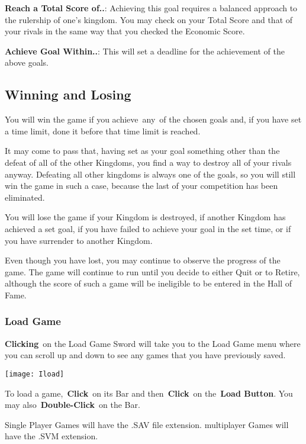 \textbf{Reach a Total Score of..}: Achieving this goal requires a balanced approach to the rulership of one’s kingdom. You may check on your Total Score and that of your rivals in the same way that you checked the Economic Score.

\textbf{Achieve Goal Within..}: This will set a deadline for the achievement of the above goals.

\subsection{Winning and Losing}

You will win the game if you achieve any of the chosen goals and, if you have set a time limit, done it before that time limit is reached.

It may come to pass that, having set as your goal something other than the defeat of all of the other Kingdoms, you find a way to destroy all of your rivals anyway. Defeating all other kingdoms is always one of the goals, so you will still win the game in such a case, because the last of your competition has been eliminated.

You will lose the game if your Kingdom is destroyed, if another Kingdom has achieved a set goal, if you have failed to achieve your goal in the set time, or if you have surrender to another Kingdom.

Even though you have lost, you may continue to observe the progress of the game. The game will continue to run until you decide to either Quit or to Retire, although the score of such a game will be ineligible to be entered in the Hall of Fame.

\subsubsection{Load Game}


\textbf{Clicking} on the Load Game Sword will take you to the Load Game menu where you can scroll up and down to see any games that you have previously saved.

\begin{center}
	\texttt{[image: Iload]}
\end{center}

To load a game, \textbf{Click} on its Bar and then \textbf{Click} on the \textbf{Load Button}. You may also \textbf{Double-Click} on the Bar.

Single Player Games will have the .SAV file extension. multiplayer Games will have the .SVM extension.

